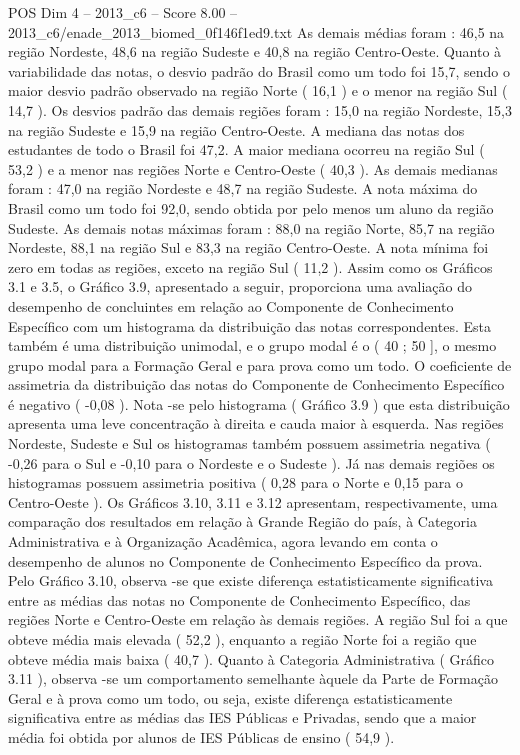 \begin{textsample}{POS Dim 4 – 2013\_c6 – Score 8.00 – 2013\_c6/enade\_2013\_biomed\_0f146f1ed9.txt}
As demais médias foram : 46,5 na região Nordeste, 48,6 na região Sudeste e 40,8 na região Centro-Oeste.
Quanto à variabilidade das notas, o desvio padrão do Brasil como um todo foi 15,7, sendo o maior desvio padrão observado na região Norte ( 16,1 ) e o menor na região Sul ( 14,7 ).
Os desvios padrão das demais regiões foram : 15,0 na região Nordeste, 15,3 na região Sudeste e 15,9 na região Centro-Oeste.
A mediana das notas dos estudantes de todo o Brasil foi 47,2.
A maior mediana ocorreu na região Sul ( 53,2 ) e a menor nas regiões Norte e Centro-Oeste ( 40,3 ).
As demais medianas foram : 47,0 na região Nordeste e 48,7 na região Sudeste.
A nota máxima do Brasil como um todo foi 92,0, sendo obtida por pelo menos um aluno da região Sudeste.
As demais notas máximas foram : 88,0 na região Norte, 85,7 na região Nordeste, 88,1 na região Sul e 83,3 na região Centro-Oeste.
A nota mínima foi zero em todas as regiões, exceto na região Sul ( 11,2 ).
Assim como os Gráficos 3.1 e 3.5, o Gráfico 3.9, apresentado a seguir, proporciona uma avaliação do desempenho de concluintes em relação ao Componente de Conhecimento Específico com um histograma da distribuição das notas correspondentes.
Esta também é uma distribuição unimodal, e o grupo modal é o ( 40 ; 50 ], o mesmo grupo modal para a Formação Geral e para prova como um todo.
O coeficiente de assimetria da distribuição das notas do Componente de Conhecimento Específico é negativo ( -0,08 ).
Nota -se pelo histograma ( Gráfico 3.9 ) que esta distribuição apresenta uma leve concentração à direita e cauda maior à esquerda.
Nas regiões Nordeste, Sudeste e Sul os histogramas também possuem assimetria negativa ( -0,26 para o Sul e -0,10 para o Nordeste e o Sudeste ).
Já nas demais regiões os histogramas possuem assimetria positiva ( 0,28 para o Norte e 0,15 para o Centro-Oeste ).
Os Gráficos 3.10, 3.11 e 3.12 apresentam, respectivamente, uma comparação dos resultados em relação à Grande Região do país, à Categoria Administrativa e à Organização Acadêmica, agora levando em conta o desempenho de alunos no Componente de Conhecimento Específico da prova.
Pelo Gráfico 3.10, observa -se que existe diferença estatisticamente significativa entre as médias das notas no Componente de Conhecimento Específico, das regiões Norte e Centro-Oeste em relação às demais regiões.
A região Sul foi a que obteve média mais elevada ( 52,2 ), enquanto a região Norte foi a região que obteve média mais baixa ( 40,7 ).
Quanto à Categoria Administrativa ( Gráfico 3.11 ), observa -se um comportamento semelhante àquele da Parte de Formação Geral e à prova como um todo, ou seja, existe diferença estatisticamente significativa entre as médias das IES Públicas e Privadas, sendo que a maior média foi obtida por alunos de IES Públicas de ensino ( 54,9 ).

\end{textsample}
